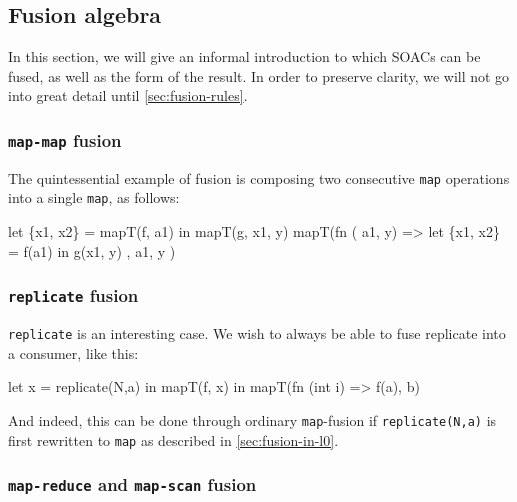 \subsection{Fusion algebra}
\label{sec:fusionalgebra}

In this section, we will give an informal introduction to which SOACs
can be fused, as well as the form of the result.  In order to preserve
clarity, we will not go into great detail until
\cref{sec:fusion-rules}.

\subsubsection{\texttt{map-map} fusion}

The quintessential example of fusion is composing two consecutive
\texttt{map} operations into a single \texttt{map}, as follows:

\begin{colorcode}
let \{x1, x2\} = mapT(f, a1)
in  mapT(g, x1, y)
    \emphh{\mymath{\Downarrow}}
mapT(fn \mymath{\beta} ( a1,  y) =>
      let \{x1, x2\} = f(a1)
      in  g(x1, y)
    , a1, y )
\end{colorcode}

\subsubsection{\texttt{replicate} fusion}

\texttt{replicate} is an interesting case.  We wish to always be able
to fuse replicate into a consumer, like this:

\begin{colorcode}
let x = replicate(N,a) in
mapT(f, x) in
    \emphh{\mymath{\Downarrow}}
mapT(fn  (int i) =>
       f(a), b)
\end{colorcode}

And indeed, this can be done through ordinary \texttt{map}-fusion if
\texttt{replicate(N,a)} is first rewritten to \texttt{map} as
described in \cref{sec:fusion-in-l0}.

\subsubsection{\texttt{map-reduce} and \texttt{map-scan} fusion}

